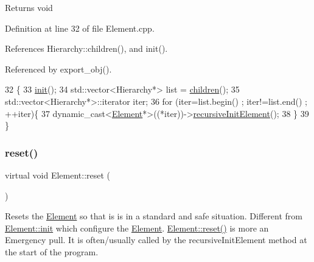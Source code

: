 \begin{DoxyReturn}{Returns}
void 
\end{DoxyReturn}


Definition at line 32 of file Element.\+cpp.



References Hierarchy\+::children(), and init().



Referenced by export\+\_\+obj().


\begin{DoxyCode}
32                                   \{
33   \hyperlink{classElement_af42754b5cabc198869222725218d695c}{init}();
34   std::vector<Hierarchy*> list = \hyperlink{classHierarchy_aa9a76f69e98e052ee1a6e32cea006288}{children}();
35   std::vector<Hierarchy*>::iterator iter;
36   \textcolor{keywordflow}{for} (iter=list.begin() ; iter!=list.end() ; ++iter)\{
37     \textcolor{keyword}{dynamic\_cast<}\hyperlink{classElement}{Element}*\textcolor{keyword}{>}((*iter))->\hyperlink{classElement_a3c0abcb36f8906688bb7e32608df7086}{recursiveInitElement}();
38   \}
39 \}
\end{DoxyCode}
\mbox{\label{classElement_a69efffa22f06909d768149715565cb56}} 
\subsubsection{\texorpdfstring{reset()}{reset()}}
{\footnotesize\ttfamily virtual void Element\+::reset (\begin{DoxyParamCaption}{ }\end{DoxyParamCaption})\hspace{0.3cm}{\ttfamily [pure virtual]}}

Resets the \hyperlink{classElement}{Element} so that is is in a standard and safe situation. Different from \hyperlink{classElement_af42754b5cabc198869222725218d695c}{Element\+::init} which configure the \hyperlink{classElement}{Element}. \hyperlink{classElement_a69efffa22f06909d768149715565cb56}{Element\+::reset()} is more an Emergency pull. It is often/usually called by the recursive\+Init\+Element method at the start of the program. 


